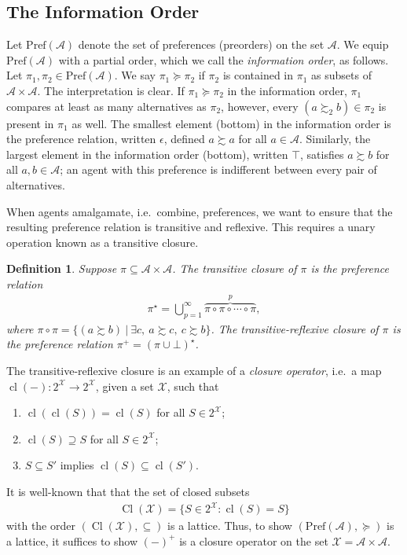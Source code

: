 \documentclass[conference]{ieeeconf}
\newcommand{\powerset}[1]{2^{#1}}
\newcommand{\A}{\mathcal{A}}
\newcommand{\X}{\mathcal{X}}
\renewcommand{\P}{\mathrm{Pref}}
\newcommand{\prefers}{\succsim}
\DeclareMathOperator{\cl}{cl}
\DeclareMathOperator{\Cl}{Cl}
\newtheorem{definition}{Definition}
\begin{document}
\subsection{The Information Order}

Let $\P(\A)$ denote the set of preferences (preorders) on the set $\A$. We equip $\P(\A)$ with a partial order, which we call the \emph{information order}, as follows. Let $\pi_1, \pi_2 \in \P(\A)$. We say $\pi_1 \succeq \pi_2$ if $\pi_2$ is contained in $\pi_1$ as subsets of $\A \times \A$. The interpretation is clear. If $\pi_1 \succeq \pi_2$ in the information order, $\pi_1$ compares at least as many alternatives as $\pi_2$, however, every $(a \prefers_2 b) \in \pi_2$ is present in $\pi_1$ as well. The smallest element (bottom) in the information order is the preference relation, written $\epsilon$, defined $a \prefers a$ for all $a \in \A$. Similarly, the largest element in the information order (bottom), written $\top$, satisfies $a \prefers b$ for all $a,b \in \A$; an agent with this preference is indifferent between every pair of alternatives.

When agents amalgamate, i.e.~combine, preferences, we want to ensure that the resulting preference relation is transitive and reflexive. This requires a unary operation known as a transitive closure.
\begin{definition}
    Suppose $\pi \subseteq \A \times \A$. The \emph{transitive closure} of $\pi$ is the preference relation 
\begin{align}
    \pi^{\star} = \bigcup_{p=1}^{\infty} \overbrace{\pi \circ \pi \circ \cdots \circ \pi}^{p}, \label{eq:transitive-closure}
\end{align}
where $\pi \circ \pi = \{ (a \prefers b)~\vert~\exists c,~a \prefers c,~c \prefers b\}$. The \emph{transitive-reflexive closure} of $\pi$ is the preference relation $\pi^{+} = \left( \pi \cup \bot \right)^\star$.
\end{definition}

The transitive-reflexive closure is an example of a \emph{closure operator}, i.e.~a map $\cl(-): \powerset{\X} \to \powerset{\X}$, given a set $\X$, such that
\begin{enumerate}
    \item $\cl(\cl(S)) = \cl(S)$ for all $S \in \powerset{\X}$;
    \item $\cl(S) \supseteq S$ for all $S \in \powerset{\X}$;
    \item $S \subseteq S'$ implies $\cl(S) \subseteq \cl(S')$.
\end{enumerate}
It is well-known that that the set of closed subsets
\begin{align*}
    \Cl(\X) = \{ S \in \powerset{\X}: \cl(S) = S\}
\end{align*}
with the order $(\Cl(\X), \subseteq)$ is a lattice. Thus, to show $\left(\P(\A), \succeq \right)$ is a lattice, it suffices to show $(-)^{+}$ is a closure operator on the set $\X = \A \times \A$.
\end{document}

